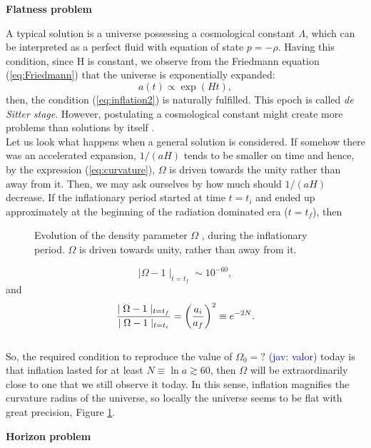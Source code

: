 \documentclass{rmaa}
\def\beq{\begin{equation}}
\def\eeq{\end{equation}}
\newcommand{\jav}[1]{\textcolor{blue}{(jav: #1)}}
\begin{document}
\noindent
\textbf {Flatness problem}
\vskip 6pt
 
A typical solution is a universe possessing a cosmological constant $\Lambda$, which can be 
interpreted as a perfect fluid with equation of state $p=-\rho$. Having this condition, 
since H is constant, we observe from the Friedmann equation (\ref{eq:Friedmann}) that 
the universe is exponentially expanded:
%
\beq
a(t)\propto \exp(Ht),
\eeq
then, the condition  
(\ref{eq:inflation2}) is naturally fulfilled. This epoch is called \textit{de Sitter stage}.
However, postulating a cosmological constant might create more problems than
solutions by itself \citep{Carrol01}.
\\

Let us look what happens when a general solution is considered.
If somehow there was an accelerated expansion, $1/(aH)$ tends to be smaller on time and hence,
by the expression (\ref{eq:curvature}), $\Omega$ is driven towards the unity rather than away from it. 
Then, we may ask ourselves by how much should $1/(aH)$ decrease. 
If the inflationary period started at time $t=t_i$ 
and ended up approximately at the beginning of the radiation dominated era ($t=t_f$), then 

\begin{figure}[t!] 
\centerline{ \epsfxsize=200pt  }
\caption{Evolution of the density parameter $\Omega$ , during the inflationary period. $\Omega$ is
driven towards unity, rather than away from it.}%
\label{fig:curvature}
\end{figure}

$$
\mid \Omega -1\mid_{t=t_f}\sim10^{-60},
$$
and
\beq
\frac{\mid \Omega -1\mid_{t=t_f}}{\mid \Omega -1\mid_{t=t_i}}= \left( a_i \over a_f \right)^2\equiv e^{-2N}.
\eeq
\\

So, the required condition to reproduce the value of $\Omega_0=?$ \jav{valor} today is 
that inflation lasted for at least $N\equiv\ln a \gtrsim 60 $, then $\Omega$ will be
extraordinarily close to one that we still observe it today.
In this sense, inflation magnifies the curvature radius of the universe, so 
locally the universe seems to be flat with great precision, Figure \ref{fig:curvature}.



\vskip 16pt
\noindent
\textbf{Horizon problem}
\vskip 6pt
\end{document}
